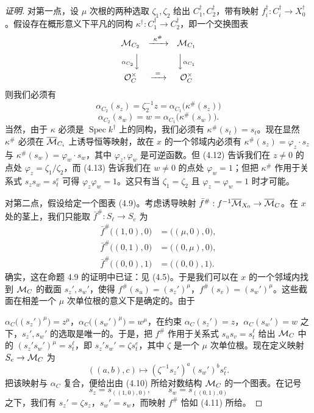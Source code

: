 \begin{proof}[证明]
对第一点，设 $\mu$ 次根的两种选取 $\zeta_1,\zeta_2$ 给出 $C_1^\dagger,C_2^\dagger$，带有映射 $f_i^\dagger:C_i^\dagger\to X_0^\dagger$。假设存在概形意义下平凡的同构 $\kappa^\dagger:C_1^\dagger\to C_2^\dagger$，即一个交换图表
\begin{equation*}
\begin{array}{ccc}
\mathcal{M}_{C_2} & \xrightarrow{\ \kappa^\#\ } & \mathcal{M}_{C_1}\\[6pt]
{\scriptstyle\alpha_{C_2}}\Big\downarrow & & \Big\downarrow{\scriptstyle\alpha_{C_1}}\\[6pt]
\mathcal{O}_C^\times & \xrightarrow{\ =\ } & \mathcal{O}_C^\times
\end{array}
\end{equation*}
则我们必须有
\begin{equation}
\alpha_{C_2}(s_z)=\zeta_2^{-1}z=\alpha_{C_1}\big(\kappa^\#(s_z)\big)
\tag{4.12}
\end{equation}
\begin{equation}
\alpha_{C_2}(s_w)=w=\alpha_{C_1}\big(\kappa^\#(s_w)\big).
\tag{4.13}
\end{equation}
当然，由于 $\kappa$ 必须是 $\operatorname{Spec}k^\dagger$ 上的同构，我们必须有 $\kappa^\#(s_t)=s_t$。现在显然 $\kappa^\#$ 必须在 $\overline{\mathcal{M}}_{C_i}$ 上诱导恒等映射，故在 $x$ 的一个邻域内必须有 $\kappa^\#(s_z)=\varphi_z\cdot s_z$ 与 $\kappa^\#(s_w)=\varphi_w\cdot s_w$，其中 $\varphi_z,\varphi_w$ 是可逆函数。但 (4.12) 告诉我们在 $z\ne0$ 的点处 $\varphi_z=\zeta_1/\zeta_2$，而 (4.13) 告诉我们在 $w\ne0$ 的点处 $\varphi_w=1$；但把 $\kappa^\#$ 作用于关系式 $s_zs_w=s_t^e$ 可得 $\varphi_z\varphi_w=1$。这只有当 $\zeta_1=\zeta_2$ 且 $\varphi_z=\varphi_w=1$ 时才可能。

对第二点，假设给定一个图表 (4.9)。考虑诱导映射 $\bar f^\#:f^{-1}\overline{\mathcal{M}}_{X_0}\to\overline{\mathcal{M}}_C$。在 $x$ 处的茎上，我们只能取 $\bar f^\#:S_\ell\to S_e$ 为
\begin{align*}
\bar f^\#\big((1,0),0\big)&=\big((\mu,0),0\big),\\
\bar f^\#\big((0,1),0\big)&=\big((0,\mu),0\big),\\
\bar f^\#\big((0,0),1\big)&=\big((0,0),1\big).
\end{align*}
确实，这在命题 4.9 的证明中已证：见 (4.5)。于是我们可以在 $x$ 的一个邻域内找到 $\mathcal{M}_C$ 的截面 $s_z',s_w'$，使得 $f^\#(s_u)=(s_z')^\mu$，$f^\#(s_v)=(s_w')^\mu$。这些截面在相差一个 $\mu$ 次单位根的意义下是确定的。由于

$\alpha_C\big((s_z')^\mu\big)=z^\mu$，$\alpha_C\big((s_w')^\mu\big)=w^\mu$，在约束 $\alpha_C(s_z')=z$，$\alpha_C(s_w')=w$ 之下，$s_z',s_w'$ 的选取是唯一的。于是，把 $f^\#$ 作用于关系式 $s_us_v=s_t^\ell$ 给出 $\mathcal{M}_C$ 中的 $(s_z's_w')^\mu=s_t^\ell$，即 $s_z's_w'=\zeta s_t^e$，其中 $\zeta$ 是一个 $\mu$ 次单位根。现在定义映射 $S_e\to\mathcal{M}_C$ 为
\[
((a,b),c)\mapsto(\zeta^{-1}s_z')^a(s_w')^bs_t^c.
\]
把该映射与 $\alpha_C$ 复合，便给出由 (4.10) 所给对数结构 $\mathcal{M}_C$ 的一个图表。在记号
\[
s_z=s_{((1,0),0)},\qquad s_w=s_{((0,1),0)}
\]
之下，我们有 $s_z'=\zeta s_z$，$s_w'=s_w$，而映射 $f^\#$ 恰如 (4.11) 所给。


\end{proof}
